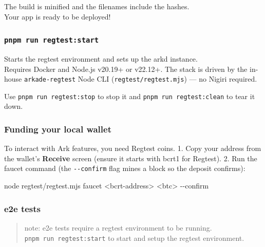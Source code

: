\documentclass[
]{article}
\newenvironment{Shaded}{}{}
\newcommand{\ExtensionTok}[1]{#1}
\newcommand{\NormalTok}[1]{#1}
\newcommand{\OperatorTok}[1]{\textcolor[rgb]{0.40,0.40,0.40}{#1}}
\begin{document}
The build is minified and the filenames include the hashes.\\
Your app is ready to be deployed!

\hypertarget{pnpm-run-regteststart}{%
\subsubsection{\texorpdfstring{\texttt{pnpm\ run\ regtest:start}}{pnpm run regtest:start}}\label{pnpm-run-regteststart}}

Starts the regtest environment and sets up the arkd instance.\\
Requires Docker and Node.js v20.19+ or v22.12+. The stack is driven by
the in-house \texttt{arkade-regtest} Node CLI
(\texttt{regtest/regtest.mjs}) --- no Nigiri required.

Use \texttt{pnpm\ run\ regtest:stop} to stop it and
\texttt{pnpm\ run\ regtest:clean} to tear it down.

\hypertarget{funding-your-local-wallet}{%
\subsubsection{Funding your local
wallet}\label{funding-your-local-wallet}}

To interact with Ark features, you need Regtest coins. 1. Copy your
address from the wallet's \textbf{Receive} screen (ensure it starts with
bcrt1 for Regtest). 2. Run the faucet command (the \texttt{-\/-confirm}
flag mines a block so the deposit confirms):

\begin{Shaded}
\begin{Highlighting}[]
\ExtensionTok{node}\NormalTok{ regtest/regtest.mjs faucet }\OperatorTok{\textless{}}\NormalTok{bcrt{-}address}\OperatorTok{\textgreater{}} \OperatorTok{\textless{}}\NormalTok{btc}\OperatorTok{\textgreater{}}\NormalTok{ {-}{-}confirm}
\end{Highlighting}
\end{Shaded}

\hypertarget{e2e-tests}{%
\subsubsection{e2e tests}\label{e2e-tests}}

\begin{quote}
note: e2e tests require a regtest environment to be running.
\texttt{pnpm\ run\ regtest:start} to start and setup the regtest
environment.
\end{quote}
\end{document}
